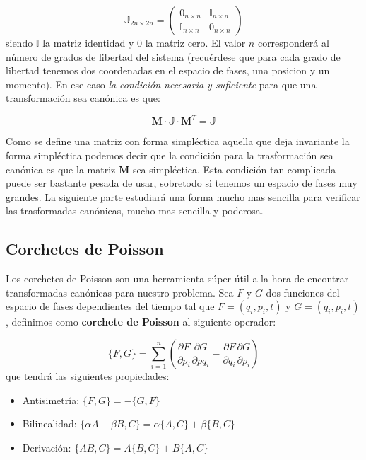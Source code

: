 \documentclass[12pt,a4paper]{article}
\numberwithin{equation}{section}
\numberwithin{figure}{section}
\newcommand{\parentesis}[1]{\left( #1  \right)}
\newcommand{\parciales}[2]{\frac{\partial #1}{\partial #2}}
\newcommand{\Mn}{\mathbf{M}}
\begin{document}
\begin{equation}
\mathbb{J}_{2n \times 2n} = \begin{pmatrix}
0_{n \times n} & \mathbb{I}_{n \times n} \\
\mathbb{I}_{n \times n} & 0_{n \times n}
\end{pmatrix}
\end{equation}
siendo $\mathbb{I}$ la matriz identidad y $0$ la matriz cero. El valor $n$ corresponderá al número de grados de libertad del sistema (recuérdese que para cada grado de libertad tenemos dos coordenadas en el espacio de fases, una posicion y un momento). En ese caso \textit{la condición necesaria y suficiente} para que una transformación sea canónica es que:

\begin{equation}
\Mn \cdot \mathbb{J} \cdot \Mn^T = \mathbb{J}
\end{equation}

Como se define una matriz con forma simpléctica aquella que deja invariante la forma simpléctica podemos decir que la condición para la trasformación sea canónica es que la matriz $\Mn$ sea simpléctica. Esta condición tan complicada puede ser bastante pesada de usar, sobretodo si tenemos un espacio de fases muy grandes. La siguiente parte estudiará una forma mucho mas sencilla para verificar las trasformadas canónicas, mucho mas sencilla y poderosa.

\subsection{Corchetes de Poisson}

Los corchetes de Poisson son una herramienta súper útil a la hora de encontrar transformadas canónicas para nuestro problema. Sea $F$ y $G$ dos funciones del espacio de fases dependientes del tiempo tal que $F=(q_i,p_i,t)$ y $G=(q_i,p_i,t)$, definimos como \textbf{corchete de Poisson} al siguiente operador:

\begin{equation}
\{ F,G \} = \sum_{i=1}^n \parentesis{\parciales{F	}{p_i}\parciales{G}{p
q_i}-\parciales{F}{q_i}\parciales{G}{p_i}}
\end{equation}
que tendrá las siguientes propiedades:

\begin{itemize}
\item Antisimetría: $\{ F,G \} = - \{ G,F \}$
\item Bilinealidad: $\{ \alpha A + \beta B, C \} = \alpha \{A,C\} + \beta \{B,C\}$
\item Derivación: $\{AB,C \} = A\{ B,C \}+ B \{ A,C \}$
\end{itemize}
\end{document}
